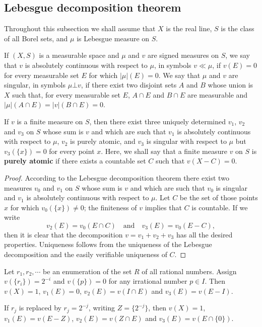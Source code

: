 \subsection{Lebesgue decomposition theorem}

Throughout this subsection we shall assume that $X$ is the real line, 
$S$ is the class of all Borel sets,
and $\mu$ is Lebesgue measure on $S$.

If $(X, S)$ is a measurable space and $\mu$ and $v$ are signed measures on $S$, 
we say that $v$ is absolutely continuous with respect to $\mu$,
in symbols $v \ll \mu$, if $v(E) = 0$ for every measurable set $E$ for which $|\mu|(E) = 0$.
We say that $\mu$ and $v$ are singular, in symbols $\mu \bot v$,
if there exist two disjoint sets $A$ and $B$ whose union is $X$ such that,
for every measurable set $E$, $A\cap E$ and $B\cap E$ are measurable and 
$|\mu|(A\cap E) = |v|(B\cap E) = 0$.


\begin{theorem}
  If $v$ is a finite measure on $S$, 
  then there exist three uniquely determined $v_1$, $v_2$ and $v_3$ on $S$
  whose sum is $v$ and which are such that $v_1$ is absolutely continuous with respect to $\mu$, 
  $v_2$ is purely atomic, 
  and $v_3$ is singular with respect to $\mu$ but $v_3(\{x\}) = 0$ for every point $x$.
  Here, we shall say that a finite measure $v$ on $S$ is \textbf{purely atomic} 
  if there exists a countable set $C$ such that $v(X-C) = 0$.
\end{theorem}

\begin{proof}
  According to the Lebesgue decomposition theorem there exist two measures $v_0$ and $v_1$ on $S$ 
  whose sum is $v$ and which are such that $v_0$ is singular 
  and $v_1$ is absolutely continuous with respect to $\mu$.
  Let $C$ be the set of those points $x$ for which $v_0(\{x\}) \neq 0$; the finiteness of $v$ implies that 
  $C$ is countable. If we write 
  \[
  v_2(E) = v_0(E\cap C) \quad \text{and}\quad v_3(E) = v_0(E-C),
  \]
  then it is clear that the decomposition $v = v_1 + v_2 + v_3$ has all the desired properties.
  Uniqueness follows from the uniqueness of the Lebesgue decomposition 
  and the easily verifiable uniqueness of $C$.
\end{proof}

\begin{example}
  Let $r_1, r_2, \cdots$ be an enumeration of the set $R$ of all rational numbers. 
  Assign $v(\{r_i\}) = 2^{-i}$ and $v(\{p\}) = 0$ for any irrational number $p\in I$.
  Then $v(X) = 1$, $v_1(E) = 0$, $v_2(E) = v(I\cap E)$ and $v_3(E) = v(E-I)$.

  If $r_j$ is replaced by $r_j=2^{-j}$, writing $Z=\{2^{-j}\}$,
  then $v(X) = 1$, $v_1(E) = v(E-Z)$, $v_2(E) = v(Z\cap E)$ and $v_3(E) = v(E\cap\{0\})$.
\end{example}


